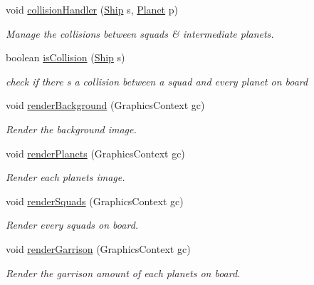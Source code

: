\begin{DoxyCompactItemize}
void \hyperlink{classfr_1_1groupe40_1_1projet_1_1model_1_1board_1_1_galaxy_a707f976a47503d6afab529da6a36a148}{collision\+Handler} (\hyperlink{classfr_1_1groupe40_1_1projet_1_1model_1_1ships_1_1_ship}{Ship} s, \hyperlink{classfr_1_1groupe40_1_1projet_1_1model_1_1planets_1_1_planet}{Planet} p)
\begin{DoxyCompactList}\small\item\em Manage the collisions between squads \& intermediate planets. \end{DoxyCompactList}\item 
boolean \hyperlink{classfr_1_1groupe40_1_1projet_1_1model_1_1board_1_1_galaxy_adb71c0d567ad5489d9f0d8890d604400}{is\+Collision} (\hyperlink{classfr_1_1groupe40_1_1projet_1_1model_1_1ships_1_1_ship}{Ship} s)
\begin{DoxyCompactList}\small\item\em check if there s a collision between a squad and every planet on board \end{DoxyCompactList}\item 
void \hyperlink{classfr_1_1groupe40_1_1projet_1_1model_1_1board_1_1_galaxy_aa24392147b91b61606b8e8e859ca3e23}{render\+Background} (Graphics\+Context gc)
\begin{DoxyCompactList}\small\item\em Render the background image. \end{DoxyCompactList}\item 
void \hyperlink{classfr_1_1groupe40_1_1projet_1_1model_1_1board_1_1_galaxy_a8490ed78537afb38bb28d86e4e37c312}{render\+Planets} (Graphics\+Context gc)
\begin{DoxyCompactList}\small\item\em Render each planets image. \end{DoxyCompactList}\item 
void \hyperlink{classfr_1_1groupe40_1_1projet_1_1model_1_1board_1_1_galaxy_a6fa32ff167eee765c18856e14679b281}{render\+Squads} (Graphics\+Context gc)
\begin{DoxyCompactList}\small\item\em Render every squads on board. \end{DoxyCompactList}\item 
void \hyperlink{classfr_1_1groupe40_1_1projet_1_1model_1_1board_1_1_galaxy_adbfc5609c012349d89f33849aa2787b0}{render\+Garrison} (Graphics\+Context gc)
\begin{DoxyCompactList}\small\item\em Render the garrison amount of each planets on board. \end{DoxyCompactList}\item 

\end{DoxyCompactItemize}

